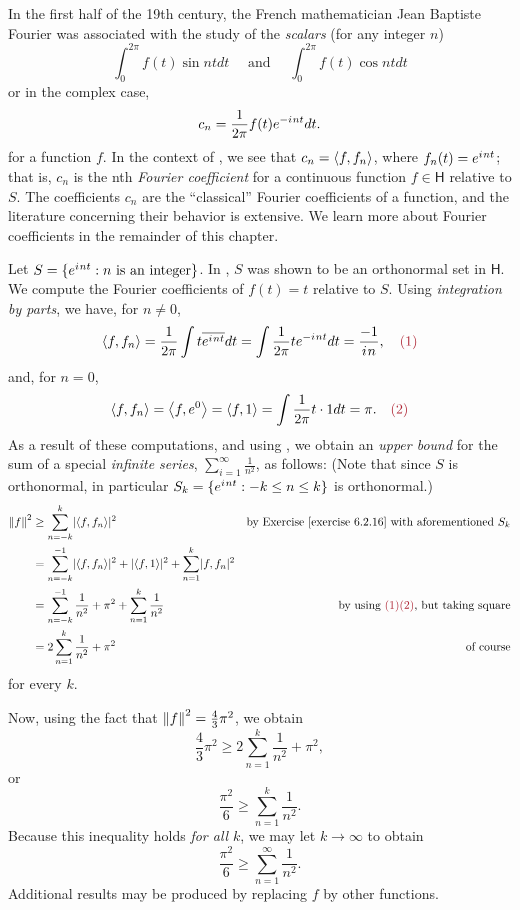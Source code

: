 \begin{remark} \label{remark 6.2.6}
In the first half of the 19th century, the French mathematician Jean Baptiste Fourier was associated with the study of the \emph{scalars} (for any integer \(n\))
\[
    \int_0^{2\pi} f(t) \sin nt dt \quad \text{ and } \quad \int_0^{2\pi} f(t) \cos nt dt
\]
or in the complex case,
\[
    c_n = \frac{1}{2\pi} f(t) e^{-{i\mkern1mu} n t} dt.
\]
for a function \(f\).
In the context of , we see that \(c_n = \left< f, f_n \right>\), where \(f_n(t) = e^{{i\mkern1mu} nt}\); that is, \(c_n\) is the nth \emph{Fourier coefficient} for a continuous function \(f \in \textsf{H}\) relative to \(S\).
The coefficients \(c_n\) are the ``classical'' Fourier coefficients of a function, and the literature concerning their behavior is extensive.
We learn more about Fourier coefficients in the remainder of this chapter.
\end{remark}

\begin{example} \label{example 6.2.7}
Let \(S = \{ e^{{i\mkern1mu} n t} : n \text{ is an integer} \}\).
In , \(S\) was shown to be an orthonormal set in \(\textsf{H}\).
We compute the Fourier coefficients of \(f(t) = t\) relative to \(S\).
Using \emph{integration by parts}, we have, for \(n \ne 0\),
\[
    \LG f, f_n \RG = \frac{1}{2\pi} \int t \conjugatet{e^{\iu n t}} dt = \int \frac{1}{2\pi} t e^{-\iu n t} dt = \frac{-1}{\iu n}, \quad \MAROON{(1)}
\]
and, for \(n = 0\),
\[
    \LG f, f_n \RG = \LG f, e^0 \RG = \LG f, 1 \RG = \int \frac{1}{2\pi} t \cdot 1 dt = \pi. \quad \MAROON{(2)}
\]
As a result of these computations, and using , we obtain an \emph{upper bound} for the sum of a special \emph{infinite series}, \(\sum_{i = 1}^{\infty} \frac{1}{n^2}\), as follows:
(Note that since \(S\) is orthonormal, in particular \(S_k = \{ e^{{i\mkern1mu} n t} : -k \le n \le k \}\) is orthonormal.)
\begin{align*}
    \norm{f}^2 & \ge \sum_{n = -k}^k \abs{ \LG f, f_n \RG }^2 & \text{by \EXEC{6.2.16} with aforementioned \(S_k\)} \\
        & = \sum_{n = -k}^{-1} \abs{ \LG f, f_n \RG }^2 + \abs{ \LG f, 1 \RG }^2 + \sum_{n = 1}^k \abs{f, f_n}^2 \\
        & = \sum_{n = -k}^{-1} \frac{1}{n^2} + \pi^2 + \sum_{n = 1}^k \frac{1}{n^2} & \text{by using \MAROON{(1)(2)}, but taking square} \\
        & = 2 \sum_{n = 1}^k \frac{1}{n^2} + \pi^2 & \text{of course}
\end{align*}
for every \(k\).

Now, using the fact that \(\left\lVert f\right\rVert^2 = \frac{4}{3}\pi^2\), we obtain
\[
    \frac{4}{3}\pi^2 \ge 2 \sum_{n = 1}^k \frac{1}{n^2} + \pi^2,
\]
or
\[
    \frac{\pi^2}{6} \ge \sum_{n = 1}^k \frac{1}{n^2}.
\]
Because this inequality holds \emph{for all} \(k\), we may let \(k \to \infty\) to obtain
\[
    \frac{\pi^2}{6} \ge \sum_{n = 1}^{\infty} \frac{1}{n^2}.
\]
Additional results may be produced by replacing \(f\) by other functions.
\end{example}

